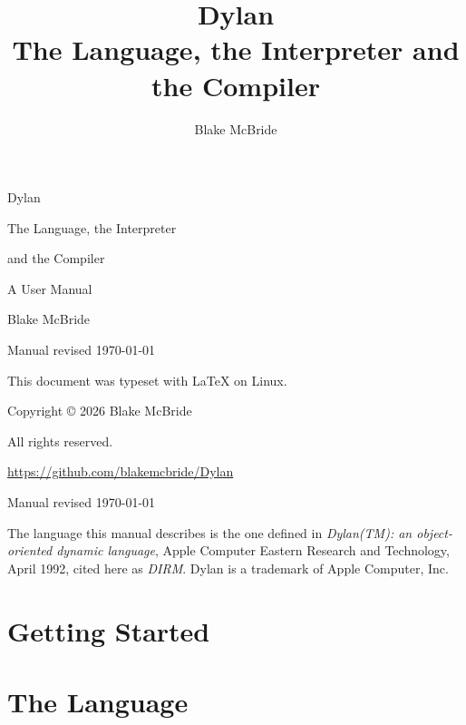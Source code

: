 \documentclass[11pt,letterpaper,twoside,openright]{book}
\title{\Huge Dylan\\[0.5em]\LARGE The Language, the Interpreter and the Compiler}
\author{Blake McBride}
\newcommand{\revisiondate}{\today}
\newcommand{\revisionline}{Manual revised \revisiondate}
\begin{document}
\frontmatter

\thispagestyle{empty}
\vspace*{2in}
\begin{center}
  {\Huge Dylan\par}
  \vspace{1em}
  {\LARGE The Language, the Interpreter\par}
  \vspace{0.3em}
  {\LARGE and the Compiler\par}
  \vspace{1.5em}
  {\large A User Manual\par}
\end{center}
\vfill
\begin{center}
  {\large Blake McBride\par}
  \vspace{0.5em}
  {\large \revisionline\par}
\end{center}
\vspace{0.5in}
\clearpage

\thispagestyle{empty}
\vspace*{4in}
\noindent This document was typeset with \LaTeX{} on Linux.\par
\bigskip
\noindent Copyright \copyright{} 2026 Blake McBride\par
\noindent All rights reserved.\par
\noindent \url{https://github.com/blakemcbride/Dylan}\par
\noindent \revisionline\par
\bigskip
\noindent The language this manual describes is the one defined in
\emph{Dylan(TM): an object-oriented dynamic language}, Apple Computer
Eastern Research and Technology, April 1992, cited here as
\emph{DIRM}. Dylan is a trademark of Apple Computer, Inc.\par
\clearpage

\tableofcontents

\mainmatter
\part{Getting Started}




\part{The Language}










\end{document}
